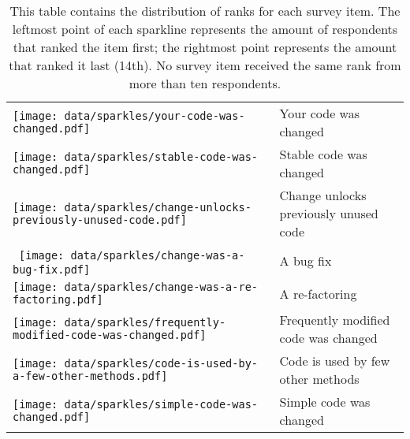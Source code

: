 \begin{table}[t!]
\begin{tabular}{ll}
\vspace{-2pt}\texttt{[image: data/sparkles/your-code-was-changed.pdf]} & Your code was changed \\
\vspace{-2pt}\texttt{[image: data/sparkles/stable-code-was-changed.pdf]} & Stable code was changed\\
\vspace{-2pt}\texttt{[image: data/sparkles/change-unlocks-previously-unused-code.pdf]} & Change unlocks previously unused code\\\
\vspace{-2pt}\texttt{[image: data/sparkles/change-was-a-bug-fix.pdf]} & A bug fix\\	
\vspace{-2pt}\texttt{[image: data/sparkles/change-was-a-re-factoring.pdf]} & A re-factoring\\ 
\vspace{-2pt}\texttt{[image: data/sparkles/frequently-modified-code-was-changed.pdf]} & Frequently modified code was changed \\
\vspace{-2pt}\texttt{[image: data/sparkles/code-is-used-by-a-few-other-methods.pdf]} & Code is used by few other methods\\ 
\vspace{-2pt}\texttt{[image: data/sparkles/simple-code-was-changed.pdf]} & Simple code was changed\\
\bottomrule
\end{tabular}
\vspace{-5pt}
\caption{This table contains the distribution of ranks for each survey item. The leftmost point of each sparkline represents the amount of respondents that ranked the item first; the rightmost point represents the amount that ranked it last (14th). No survey item received the same rank from more than ten respondents.}
\label{tab:sparkle}
\vspace{-20pt}
\end{table}
